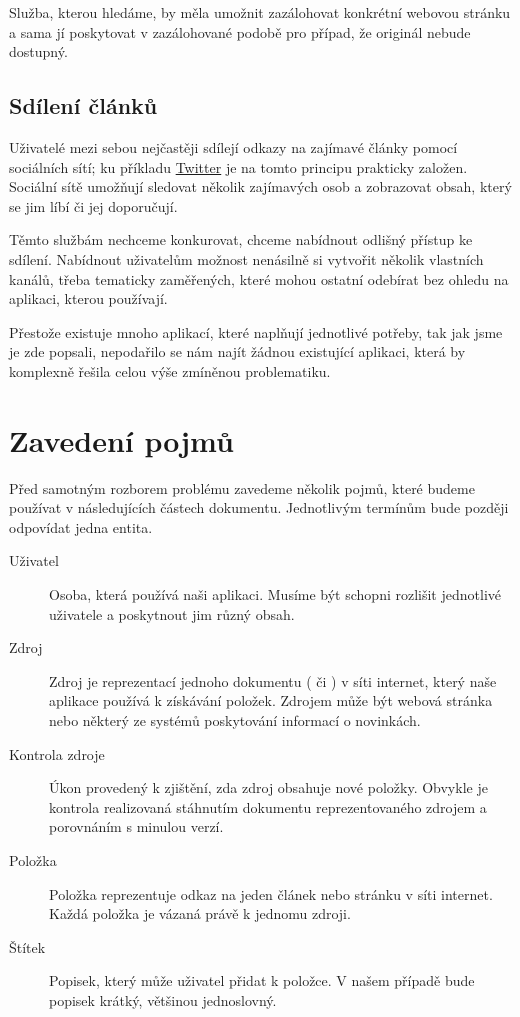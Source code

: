 Služba, kterou hledáme, by měla umožnit zazálohovat konkrétní webovou stránku a sama jí poskytovat v zazálohované podobě pro případ, že originál nebude dostupný.

\subsection{Sdílení článků}

Uživatelé mezi sebou nejčastěji sdílejí odkazy na zajímavé články pomocí sociálních sítí; ku příkladu \href{https://twitter.com/}{Twitter} je na tomto principu prakticky založen.
Sociální sítě umožňují sledovat několik zajímavých osob a zobrazovat obsah, který se jim líbí či jej doporučují.

Těmto službám nechceme konkurovat, chceme nabídnout odlišný přístup ke sdílení.
Nabídnout uživatelům možnost nenásilně si vytvořit několik vlastních kanálů, třeba tematicky zaměřených, které mohou ostatní odebírat bez ohledu na aplikaci, kterou používají.

\bigskip

Přestože existuje mnoho aplikací, které naplňují jednotlivé potřeby, tak jak jsme je zde popsali, nepodařilo se nám najít žádnou existující aplikaci, která by komplexně řešila celou výše zmíněnou problematiku.

\section{Zavedení pojmů}

Před samotným rozborem problému zavedeme několik pojmů, které budeme používat v následujících částech dokumentu.
Jednotlivým termínům bude později odpovídat jedna entita.

\begin{description}
    \item[Uživatel] Osoba, která používá naši aplikaci.
		Musíme být schopni rozlišit jednotlivé uživatele a poskytnout jim různý obsah.
	\item[Zdroj] Zdroj je reprezentací jednoho dokumentu ( či ) v síti internet, který naše aplikace používá k získávání položek.
		Zdrojem může být webová stránka nebo některý ze systémů poskytování informací o novinkách.
	\item[Kontrola zdroje] Úkon provedený k zjištění, zda zdroj obsahuje nové položky.
		Obvykle je kontrola realizovaná stáhnutím dokumentu reprezentovaného zdrojem a porovnáním s minulou verzí.
    \item[Položka] Položka reprezentuje odkaz na jeden článek nebo stránku v síti internet.
		Každá položka je vázaná právě k jednomu zdroji.
    \item[Štítek] Popisek, který může uživatel přidat k položce.
		V našem případě bude popisek krátký, většinou jednoslovný.
\end{description}

